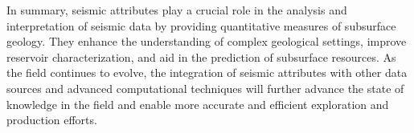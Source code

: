 In summary, seismic attributes play a crucial role in the analysis and interpretation of seismic data by providing quantitative measures of subsurface geology.
They enhance the understanding of complex geological settings, improve reservoir characterization, and aid in the prediction of subsurface resources.
As the field continues to evolve, the integration of seismic attributes with other data sources and advanced computational techniques will further advance the state of knowledge in the field and enable more accurate and efficient exploration and production efforts.
